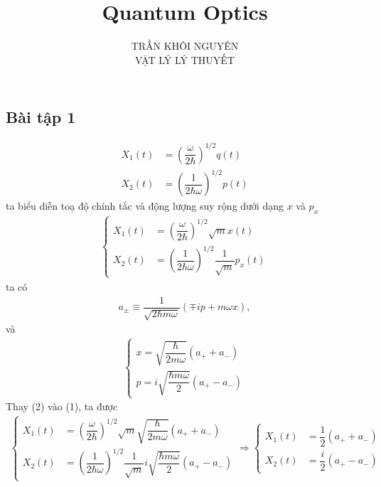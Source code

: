 \documentclass{report}
\title{\Huge{Quantum Optics}}
\newcommand{\f}[2]{\dfrac{#1}{#2}}
\begin{document}
\setlength{\parindent}{20pt}
\newpage
\author{TRẦN KHÔI NGUYÊN \\ VẬT LÝ LÝ THUYẾT}
\maketitle

\subsection*{Bài tập 1}
\begin{align*}
	X_{1} (t) &= \left(\f{\omega}{2 \hbar}\right)^{1/2} q(t) \\
	X_{2} (t) &= \left(\f{1}{2 \hbar \omega}\right)^{1/2} p(t)
\end{align*}
ta biểu diễn toạ độ chính tắc và động lượng suy rộng dưới dạng $x$ và $p_{x}$
\begin{align}
	\begin{cases}
		X_{1} (t) &= \left(\f{\omega}{2 \hbar}\right)^{1/2} \sqrt{m} x(t) \\
		X_{2} (t) &= \left(\f{1}{2 \hbar \omega}\right)^{1/2} \f{1}{\sqrt{m}} p_{x}(t)
	\end{cases}
\end{align}	
ta có 
\begin{align*}
	a_{\pm} \equiv \f{1}{\sqrt{2 \hbar m \omega}} \left( \mp i p + m \omega x \right),
\end{align*}
và
\begin{align}
	\begin{cases}
		x = \sqrt{\f{\hbar}{2 m \omega}} \left( a_{+} + a_{-} \right)\\
		p = i \sqrt{\f{\hbar m \omega}{2}} \left( a_{+} - a_{-} \right)
	\end{cases}
\end{align}	
Thay (2) vào (1), ta được
\begin{align}
	\begin{cases}
		X_{1} (t) &= \left(\f{\omega}{2 \hbar}\right)^{1/2} \sqrt{m} \sqrt{\f{\hbar}{2 m \omega}} \left( a_{+} + a_{-} \right) \\
		X_{2} (t) &= \left(\f{1}{2 \hbar \omega}\right)^{1/2} \f{1}{\sqrt{m}}  i \sqrt{\f{\hbar m \omega}{2}} \left( a_{+} - a_{-} \right)
	\end{cases}
	\Rightarrow
	\begin{cases}
		X_{1}(t) & = \f{1}{2} \left( a_{+} + a_{-} \right)\\
		X_{2}(t) & = \f{i}{2} \left( a_{+} - a_{-} \right)
	\end{cases}
\end{align}		
\end{document}
